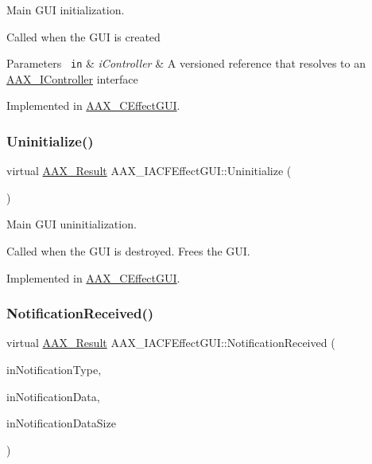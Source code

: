 Main G\+UI initialization. 

Called when the G\+UI is created


\begin{DoxyParams}[1]{Parameters}
\mbox{\texttt{ in}}  & {\em i\+Controller} & A versioned reference that resolves to an \mbox{\hyperlink{a01789}{A\+A\+X\+\_\+\+I\+Controller}} interface \\
\hline
\end{DoxyParams}


Implemented in \mbox{\hyperlink{a01477_a5fcb43bfa54847abe95c2ff76cc6cb13}{A\+A\+X\+\_\+\+C\+Effect\+G\+UI}}.

\mbox{\label{a01665_ab7d1c3c80a60637f9a9fd1860fe418cb}} 
\subsubsection{\texorpdfstring{Uninitialize()}{Uninitialize()}}
{\footnotesize\ttfamily virtual \mbox{\hyperlink{a00392_a4d8f69a697df7f70c3a8e9b8ee130d2f}{A\+A\+X\+\_\+\+Result}} A\+A\+X\+\_\+\+I\+A\+C\+F\+Effect\+G\+U\+I\+::\+Uninitialize (\begin{DoxyParamCaption}{ }\end{DoxyParamCaption})\hspace{0.3cm}{\ttfamily [pure virtual]}}



Main G\+UI uninitialization. 

Called when the G\+UI is destroyed. Frees the G\+UI. 

Implemented in \mbox{\hyperlink{a01477_a7d3230457433a1a8204114e57fef7bef}{A\+A\+X\+\_\+\+C\+Effect\+G\+UI}}.

\mbox{\label{a01665_a11a15162cb3c7019d1fabf2994fba6c6}} 
\subsubsection{\texorpdfstring{NotificationReceived()}{NotificationReceived()}}
{\footnotesize\ttfamily virtual \mbox{\hyperlink{a00392_a4d8f69a697df7f70c3a8e9b8ee130d2f}{A\+A\+X\+\_\+\+Result}} A\+A\+X\+\_\+\+I\+A\+C\+F\+Effect\+G\+U\+I\+::\+Notification\+Received (\begin{DoxyParamCaption}\item[{\mbox{\hyperlink{a00392_ac678f9c1fbcc26315d209f71a147a175}{A\+A\+X\+\_\+\+C\+Type\+ID}}}]{in\+Notification\+Type,  }\item[{const void $\ast$}]{in\+Notification\+Data,  }\item[{uint32\+\_\+t}]{in\+Notification\+Data\+Size }\end{DoxyParamCaption})\hspace{0.3cm}{\ttfamily [pure virtual]}}



